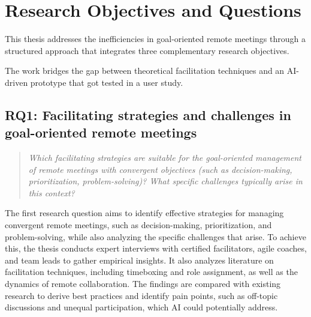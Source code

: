 \section{Research Objectives and Questions}
This thesis addresses the inefficiencies in goal-oriented remote meetings through a structured approach that
integrates three complementary research objectives.


The work bridges the gap between theoretical facilitation techniques and an AI-driven prototype that got tested
in a user study.

\subsection{RQ1: Facilitating strategies and challenges in goal-oriented remote meetings}
\begin{quote}
  \textit{Which facilitating strategies are suitable for the goal-oriented management of remote meetings with
    convergent objectives (such as decision-making, prioritization, problem-solving)? What specific challenges
  typically arise in this context?}
\end{quote}
The first research question aims to identify effective strategies for managing convergent remote meetings,
such as decision-making, prioritization, and problem-solving, while also analyzing the specific challenges
that arise. To achieve this, the thesis conducts expert interviews with certified facilitators, agile
coaches, and team leads to gather empirical insights.
It also analyzes literature on facilitation techniques,
including timeboxing and role assignment, as well as the dynamics of remote collaboration. The findings are
compared with existing research to derive best practices and identify pain points, such as off-topic
discussions and unequal participation, which AI could potentially address.

